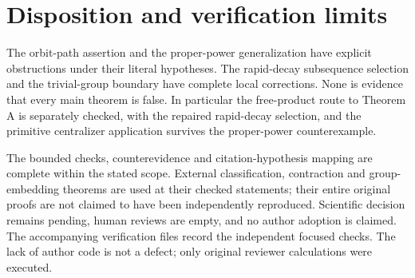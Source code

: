 \documentclass[10pt]{article}
\begin{document}
\section*{Disposition and verification limits}
The orbit-path assertion and the proper-power generalization have explicit obstructions under their literal hypotheses. The rapid-decay subsequence selection and the trivial-group boundary have complete local corrections. None is evidence that every main theorem is false. In particular the free-product route to Theorem A is separately checked, with the repaired rapid-decay selection, and the primitive centralizer application survives the proper-power counterexample.\par
The bounded checks, counterevidence and citation-hypothesis mapping are complete within the stated scope. External classification, contraction and group-embedding theorems are used at their checked statements; their entire original proofs are not claimed to have been independently reproduced. Scientific decision remains pending, human reviews are empty, and no author adoption is claimed. The accompanying verification files record the independent focused checks. The lack of author code is not a defect; only original reviewer calculations were executed.\par
\end{document}
